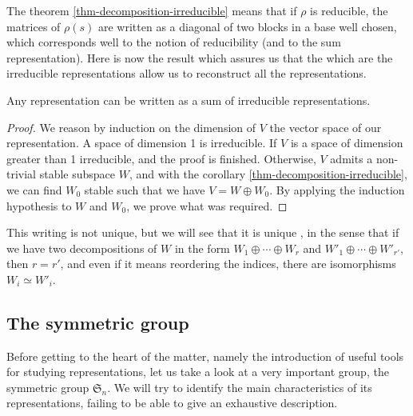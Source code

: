  
\begin{rem}
 The theorem \ref{thm-decomposition-irreducible} means that if $ \rho $ is reducible, the matrices of $ \rho (s) $ are written as a diagonal of two blocks in a base well chosen, which corresponds well to the notion of reducibility (and to the sum representation). Here is now the result which assures us that the  which are the irreducible representations allow us to reconstruct all the representations.
\end{rem}
 
 
\begin{prop}
\label{prop-decomposition-irreducible-sum}
Any representation can be written as a sum of irreducible representations.
\end{prop}
\begin{proof}
We reason by induction on the dimension of $V$ the vector space of our representation. A space of dimension 1 is irreducible. If $V$ is a space of dimension greater than 1 irreducible, and the proof is finished. Otherwise, $V$ admits a non-trivial stable subspace $ W $, and with the corollary \ref{thm-decomposition-irreducible}, we can find $ W_0 $ stable such that we have $ V = W \oplus W_0 $. By applying the induction hypothesis to $ W $ and $ W_0 $, we prove what was required.
\end{proof}
 
 
\begin{rem}
\label{rmk-unique-writing}
This writing is not unique, but we will see that it is unique , in the sense that if we have two decompositions of $ W $ in the form $ W_1 \oplus \cdots \oplus W_r $ and $ W'_1 \oplus \cdots \oplus W'_{r'} $, then $ r = r'$, and even if it means reordering the indices, there are isomorphisms $ W_i \simeq W'_i $.
\end{rem}
 
\subsection{The symmetric group}
\label{sect2-symmetric-group}
 
 
 Before getting to the heart of the matter, namely the introduction of useful tools for studying representations, let us take a look at a very important group, the symmetric group $ \mathfrak{S}_n $. We will try to identify  the main characteristics of its representations, failing to be able to give an exhaustive description.
 
